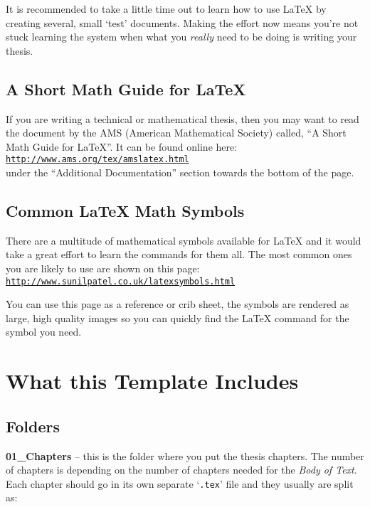 It is recommended to take a little time out to learn how to use \LaTeX{} by creating several, small `test' documents. Making the effort now means you're not stuck learning the system when what you \emph{really} need to be doing is writing your thesis.

\subsection{A Short Math Guide for \LaTeX{}}

If you are writing a technical or mathematical thesis, then you may want to read the document by the AMS (American Mathematical Society) called, ``A Short Math Guide for \LaTeX{}''. It can be found online here:\\
\href{http://www.ams.org/tex/amslatex.html}{\texttt{http://www.ams.org/tex/amslatex.html}}\\
under the ``Additional Documentation'' section towards the bottom of the page.

\subsection{Common \LaTeX{} Math Symbols}
There are a multitude of mathematical symbols available for \LaTeX{} and it would take a great effort to learn the commands for them all. The most common ones you are likely to use are shown on this page:\\
\href{http://www.sunilpatel.co.uk/latexsymbols.html}{\texttt{http://www.sunilpatel.co.uk/latexsymbols.html}}

You can use this page as a reference or crib sheet, the symbols are rendered as large, high quality images so you can quickly find the \LaTeX{} command for the symbol you need.


\section{What this Template Includes}

\subsection{Folders}

\textbf{01\_Chapters} -- this is the folder where you put the thesis chapters. The number of chapters is depending on the number of chapters needed for the \textit{Body of Text}. Each chapter should go in its own separate `\texttt{.tex}' file and they usually are split as:

